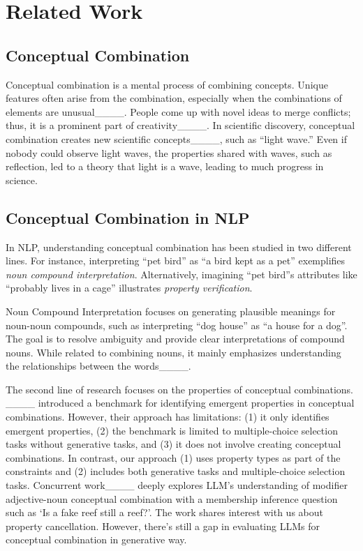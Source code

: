 \section{Related Work}
\subsection{Conceptual Combination}
Conceptual combination is a mental process of combining concepts. Unique features often arise from the combination, especially when the combinations of elements are unusual____.
People come up with novel ideas to merge conflicts; thus, it is a prominent part of creativity____.
In scientific discovery, conceptual combination creates new scientific concepts____, such as ``light wave.'' Even if nobody could observe light waves, the properties shared with waves, such as reflection, led to a theory that light is a wave, leading to much progress in science.

\subsection{Conceptual Combination in NLP} 
In NLP, understanding conceptual combination has been studied in two different lines. For instance, interpreting ``pet bird'' as ``a bird kept as a pet'' exemplifies \textit{noun compound interpretation}. Alternatively, imagining ``pet bird''s attributes like ``probably lives in a cage'' illustrates \textit{property verification}.

Noun Compound Interpretation focuses on generating plausible meanings for noun-noun compounds, such as interpreting ``dog house'' as ``a house for a dog''. The goal is to resolve ambiguity and provide clear interpretations of compound nouns. While related to combining nouns, it mainly emphasizes understanding the relationships between the words____.

The second line of research focuses on the properties of conceptual combinations. ____ introduced a benchmark for identifying emergent properties in conceptual combinations. However, their approach has limitations: (1) it only identifies emergent properties, (2) the benchmark is limited to multiple-choice selection tasks without generative tasks, and (3) it does not involve creating conceptual combinations. In contrast, our approach (1) uses property types as part of the constraints and (2) includes both generative tasks and multiple-choice selection tasks. Concurrent work____ deeply explores LLM's understanding of modifier adjective-noun conceptual combination with a membership inference question such as `Is a fake reef still a reef?'. The work shares interest with us about property cancellation. However, there's still a gap in evaluating LLMs for conceptual combination in generative way.